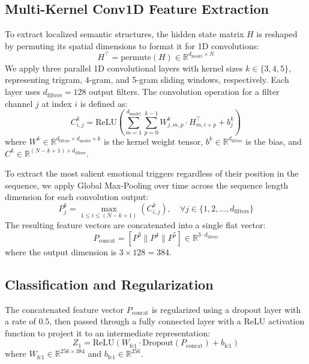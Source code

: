 \documentclass[conference]{IEEEtran}
\begin{document}
\subsection{Multi-Kernel Conv1D Feature Extraction}
To extract localized semantic structures, the hidden state matrix $H$ is reshaped by permuting its spatial dimensions to format it for 1D convolutions:
\begin{equation}
    H^{\top} = \text{permute}(H) \in \mathbb{R}^{d_{\text{model}} \times N}
\end{equation}
We apply three parallel 1D convolutional layers with kernel sizes $k \in \{3, 4, 5\}$, representing trigram, 4-gram, and 5-gram sliding windows, respectively. Each layer uses $d_{\text{filters}} = 128$ output filters. The convolution operation for a filter channel $j$ at index $i$ is defined as:
\begin{equation}
    C^k_{i, j} = \text{ReLU}\left( \sum_{m=1}^{d_{\text{model}}} \sum_{p=0}^{k-1} W^k_{j, m, p} \cdot H^{\top}_{m, i+p} + b^k_j \right)
\end{equation}
where $W^k \in \mathbb{R}^{d_{\text{filters}} \times d_{\text{model}} \times k}$ is the kernel weight tensor, $b^k \in \mathbb{R}^{d_{\text{filters}}}$ is the bias, and $C^k \in \mathbb{R}^{(N - k + 1) \times d_{\text{filters}}}$.

To extract the most salient emotional triggers regardless of their position in the sequence, we apply Global Max-Pooling over time across the sequence length dimension for each convolution output:
\begin{equation}
    P^k_j = \max_{1 \le i \le (N - k + 1)} \left( C^k_{i, j} \right), \quad \forall j \in \{1, 2, \dots, d_{\text{filters}}\}
\end{equation}
The resulting feature vectors are concatenated into a single flat vector:
\begin{equation}
    P_{\text{concat}} = [ P^3 \parallel P^4 \parallel P^5 ] \in \mathbb{R}^{3 \cdot d_{\text{filters}}}
\end{equation}
where the output dimension is $3 \times 128 = 384$.

\subsection{Classification and Regularization}
The concatenated feature vector $P_{\text{concat}}$ is regularized using a dropout layer with a rate of $0.5$, then passed through a fully connected layer with a ReLU activation function to project it to an intermediate representation:
\begin{equation}
    Z_1 = \text{ReLU}\left( W_{\text{fc1}} \cdot \text{Dropout}(P_{\text{concat}}) + b_{\text{fc1}} \right)
\end{equation}
where $W_{\text{fc1}} \in \mathbb{R}^{256 \times 384}$ and $b_{\text{fc1}} \in \mathbb{R}^{256}$.
\end{document}
